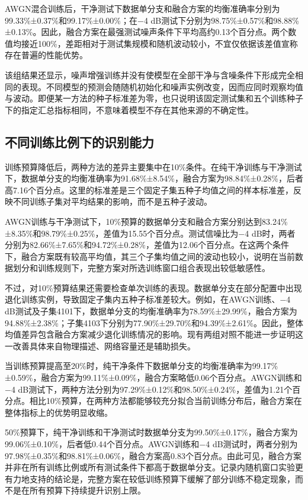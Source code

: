 \documentclass[UTF8,12pt,openany,twoside]{ctexbook}
\numberwithin{equation}{chapter}
\begin{document}
AWGN混合训练后，干净测试下数据单分支和融合方案的均衡准确率分别为99.33\%±0.37\%和99.17\%±0.00\%；在−4 dB测试下分别为98.75\%±0.57\%和98.88\%±0.13\%。因此，融合方案在最强测试噪声条件下平均高约0.13个百分点。两个数值均接近100\%，差距相对于测试集规模和随机波动较小，不宜仅依据该差值宣称存在普遍的性能优势。

该组结果还显示，噪声增强训练并没有使模型在全部干净与含噪条件下形成完全相同的表现。不同模型的预测会随随机初始化和噪声实例改变，因而应同时观察均值与波动。即便某一方法的种子标准差为零，也只说明该固定测试集和五个训练种子下的指定汇总指标相同，不意味着模型不存在其他来源的不确定性。

\subsection{不同训练比例下的识别能力}\label{ux4e0dux540cux8badux7ec3ux6bd4ux4f8bux4e0bux7684ux8bc6ux522bux80fdux529b}

训练预算降低后，两种方法的差异主要集中在10\%条件。在纯干净训练与干净测试下，数据单分支的均衡准确率为91.68\%±8.54\%，融合方案为98.84\%±0.28\%，后者高7.16个百分点。这里的标准差是三个固定子集五种子均值之间的样本标准差，反映不同训练子集对平均结果的影响，而不是五种子波动。

AWGN训练与干净测试下，10\%预算的数据单分支和融合方案分别达到83.24\%±8.35\%和98.79\%±0.25\%，差值为15.55个百分点。测试信噪比为−4 dB时，两者分别为82.66\%±7.65\%和94.72\%±0.28\%，差值为12.06个百分点。在这两个条件下，融合方案既有较高平均值，其三个子集均值之间的波动也较小，说明在当前数据划分和训练规则下，完整方案对所选训练窗口组合表现出较低敏感性。

不过，对10\%预算结果还需要检查单次训练的表现。数据单分支在部分配置中出现退化训练实例，导致固定子集内五种子标准差较大。例如，在AWGN训练、−4 dB测试及子集4101下，数据单分支的均衡准确率为78.59\%±29.99\%，融合方案为94.88\%±2.38\%；子集4103下分别为77.90\%±29.70\%和94.39\%±2.61\%。因此，整体均值差异包含融合方案减少退化训练情况的影响。现有两组对照不能进一步证明这一改善具体来自物理描述、网络容量还是辅助损失。

当训练预算提高至20\%时，纯干净条件下数据单分支的均衡准确率为99.17\%±0.59\%，融合方案为99.11\%±0.09\%，融合方案略低0.06个百分点。AWGN训练和−4 dB测试下，两种方法分别为97.29\%±0.12\%和98.50\%±0.24\%，差值为1.21个百分点。相比10\%预算，在两种方法都能够较充分拟合当前训练分布后，融合方案在整体指标上的优势明显收缩。

50\%预算下，纯干净训练和干净测试时数据单分支为99.50\%±0.17\%，融合方案为99.06\%±0.10\%，后者低0.44个百分点。AWGN训练和−4 dB测试时，两者分别为97.98\%±0.35\%和98.81\%±0.06\%，融合方案高0.83个百分点。由此可见，融合方案并非在所有训练比例或所有测试条件下都高于数据单分支。记录内随机窗口实验更有力地支持的结论是，完整方案在较低训练预算下缓解了部分训练不稳定现象，而不是在所有预算下持续提升识别上限。
\end{document}
